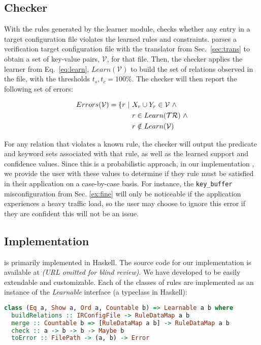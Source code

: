 \subsection{Checker}
\label{sec-checker}

With the rules generated by the learner module, \app checks whether any entry in a target configuration file violates the learned rules and constraints.
\app parses a verification target configuration file with the translator from Sec.~\ref{sec:trans}  to obtain a set of key-value pairs, $\mathcal{V}$, for that file.
Then, the checker applies the learner from Eq.~\ref{eq:learn}, $Learn(\mathcal{V})$ to build the set of relations observed in the file, with the thresholds $t_s,t_c = 100\%$. 
The checker will then report the following set of errors:

\begin{align*}
Errors(\mathcal{V}) = \{ r\ |\ & X_r \cup Y_r \in \mathcal{V} \ \land \\
                               & r \in Learn(\trainingSet) \ \land \\
                               & r \notin Learn(\mathcal{V})
\end{align*}

For any relation that violates a known rule, the checker will output the predicate and keyword sets associated with that rule, as well as the learned support and confidence values.
Since this is a probabilistic approach, in our implementation \app, we provide the user with these values to determine if they rule must be satisfied in their application on a case-by-case basis.
For instance, the \texttt{key\_buffer} misconfiguration from Sec. \ref{ex:fine} will only be noticeable if the application experiences a heavy traffic load, so the user may choose to ignore this error if they are confident this will not be an issue.

\subsection{Implementation}

\app is primarily implemented in Haskell.
The source code for our implementation is available at {\em (URL omitted for blind review)}.
We have developed \app to be easily extendable and customizable. Each of the classes of rules are implemented as an instance of the \textit{Learnable} interface (a typeclass in Haskell):

\begin{lstlisting}[language=Haskell, xleftmargin=.01\textwidth]
class (Eq a, Show a, Ord a, Countable b) => Learnable a b where
  buildRelations :: IRConfigFile -> RuleDataMap a b
  merge :: Countable b => [RuleDataMap a b] -> RuleDataMap a b
  check :: a -> b -> b -> Maybe b
  toError :: FilePath -> (a, b) -> Error
\end{lstlisting} 

